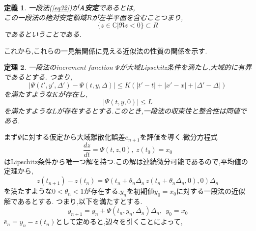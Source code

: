\documentclass[a4paper,dvipdfmx]{jreport}
\def\qedsymbol{$\square$}
\def\proofname{\gt{証明}\;}
\newenvironment{Proof}{\par\noindent{\it\proofname}}{{\unskip\nobreak\hfill{\it\qedsymbol}}\par\vskip 9pt}
\numberwithin{equation}{section}
\newtheorem{Thm}     {定理}[section]
\newtheorem{Def}     [Thm]{定義}
\renewenvironment{leftbar}{%
  \def\FrameCommand{\vrule width 1pt \hspace{10pt}}%
  \MakeFramed {\advance\hsize-\width \FrameRestore}}%
 {\endMakeFramed}
\def\C{\mathbb C}
\def\thm{\begin{leftbar}\begin{Thm}}
\def\thmx{\end{Thm}\end{leftbar}}
\def\defb{\begin{leftbar}\begin{Def}}
\def\defx{\end{Def}\end{leftbar}}
\def\proof{\begin{Proof}}
\def\gt{>}
\begin{document}
\defb
一段法(\ref{eq32})が{\bf A安定}であるとは,\\
この一段法の絶対安定領域$R$が左半平面を含むことつまり,
\[
\{z \in \C | \Re z < 0 \} \subset R
\]
であるということである.
\defx
これから,これらの一見無関係に見える近似法の性質の関係を示す.
\thm
一段法のincrement function $\Psi$が大域Lipschitz条件を満たし,大域的に有界であるとする.
つまり,
\[
|\Psi(t',y',\Delta') -\Psi(t,y,\Delta)| \le K (|t'-t| + |x'-x| + |\Delta' - \Delta|)
\]
を満たすような$K$が存在し,
\[
|\Psi(t,y,0)| \le L
\]
を満たすような$L$が存在するとする.このとき,一段法の収束性と整合性は同値である.
\thmx
\proof
まず$\Psi$に対する仮定から大域離散化誤差$e_{n+1}$を評価を導く.微分方程式
\[
\frac{dz}{dt} = \Psi(t,z,0) ,\ z(t_0) = x_0
\]
はLipschitz条件から唯一つ解を持つ.この解は連続微分可能であるので,平均値の定理から,
\[
z(t_{n+1}) - z(t_n) = \Psi(t_n+\theta_n\Delta_n \,z(t_n+\theta_n\Delta_n,0),0) \Delta_n
\]
を満たすような$0 < \theta_n < 1$が存在する.$y_n$を初期値$y_0 = x_0$に対する一段法の近似解であるとする.
つまり,以下を満たすとする.
\[
y_{n+1} = y_n + \Psi(t_n,y_n,\Delta_n) \Delta_n,\  \  y_0 = x_0
\]
$\bar{e}_{n} = y_n - z(t_n)$として定めると,辺々を引くことによって,
\end{document}
